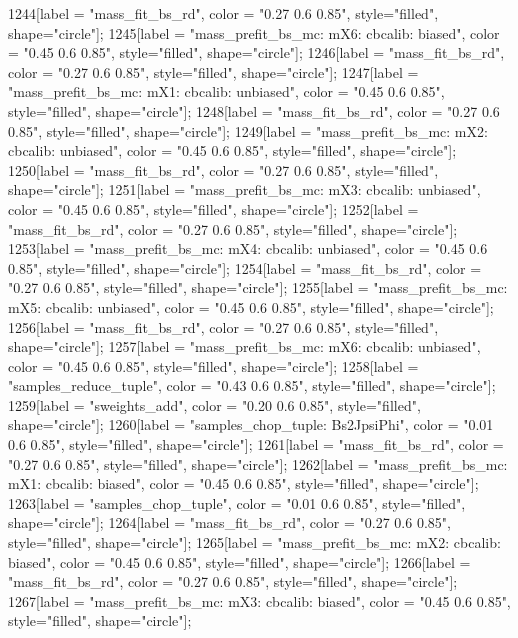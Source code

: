 {	1244[label = "mass_fit_bs_rd", color = "0.27 0.6 0.85", style="filled", shape="circle"];
	1245[label = "mass_prefit_bs_mc\nmassbin: mX6\nmassmodel: cbcalib\ntrigger: biased", color = "0.45 0.6 0.85", style="filled", shape="circle"];
	1246[label = "mass_fit_bs_rd", color = "0.27 0.6 0.85", style="filled", shape="circle"];
	1247[label = "mass_prefit_bs_mc\nmassbin: mX1\nmassmodel: cbcalib\ntrigger: unbiased", color = "0.45 0.6 0.85", style="filled", shape="circle"];
	1248[label = "mass_fit_bs_rd", color = "0.27 0.6 0.85", style="filled", shape="circle"];
	1249[label = "mass_prefit_bs_mc\nmassbin: mX2\nmassmodel: cbcalib\ntrigger: unbiased", color = "0.45 0.6 0.85", style="filled", shape="circle"];
	1250[label = "mass_fit_bs_rd", color = "0.27 0.6 0.85", style="filled", shape="circle"];
	1251[label = "mass_prefit_bs_mc\nmassbin: mX3\nmassmodel: cbcalib\ntrigger: unbiased", color = "0.45 0.6 0.85", style="filled", shape="circle"];
	1252[label = "mass_fit_bs_rd", color = "0.27 0.6 0.85", style="filled", shape="circle"];
	1253[label = "mass_prefit_bs_mc\nmassbin: mX4\nmassmodel: cbcalib\ntrigger: unbiased", color = "0.45 0.6 0.85", style="filled", shape="circle"];
	1254[label = "mass_fit_bs_rd", color = "0.27 0.6 0.85", style="filled", shape="circle"];
	1255[label = "mass_prefit_bs_mc\nmassbin: mX5\nmassmodel: cbcalib\ntrigger: unbiased", color = "0.45 0.6 0.85", style="filled", shape="circle"];
	1256[label = "mass_fit_bs_rd", color = "0.27 0.6 0.85", style="filled", shape="circle"];
	1257[label = "mass_prefit_bs_mc\nmassbin: mX6\nmassmodel: cbcalib\ntrigger: unbiased", color = "0.45 0.6 0.85", style="filled", shape="circle"];
	1258[label = "samples_reduce_tuple", color = "0.43 0.6 0.85", style="filled", shape="circle"];
	1259[label = "sweights_add", color = "0.20 0.6 0.85", style="filled", shape="circle"];
	1260[label = "samples_chop_tuple\nmode: Bs2JpsiPhi", color = "0.01 0.6 0.85", style="filled", shape="circle"];
	1261[label = "mass_fit_bs_rd", color = "0.27 0.6 0.85", style="filled", shape="circle"];
	1262[label = "mass_prefit_bs_mc\nmassbin: mX1\nmassmodel: cbcalib\ntrigger: biased", color = "0.45 0.6 0.85", style="filled", shape="circle"];
	1263[label = "samples_chop_tuple", color = "0.01 0.6 0.85", style="filled", shape="circle"];
	1264[label = "mass_fit_bs_rd", color = "0.27 0.6 0.85", style="filled", shape="circle"];
	1265[label = "mass_prefit_bs_mc\nmassbin: mX2\nmassmodel: cbcalib\ntrigger: biased", color = "0.45 0.6 0.85", style="filled", shape="circle"];
	1266[label = "mass_fit_bs_rd", color = "0.27 0.6 0.85", style="filled", shape="circle"];
	1267[label = "mass_prefit_bs_mc\nmassbin: mX3\nmassmodel: cbcalib\ntrigger: biased", color = "0.45 0.6 0.85", style="filled", shape="circle"];
}
